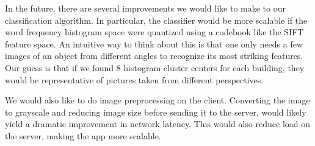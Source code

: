 In the future, there are several improvements we would like to make to our classification algorithm. 
In particular, the classifier would be more scalable if the word frequency histogram space were quantized using a codebook like the SIFT feature space. 
An intuitive way to think about this is that one only needs a few images of an object from different angles to recognize its most striking features.
Our guess is that if we found 8 histogram cluster centers for each building, they would be representative of pictures taken from different perspectives.

We would also like to do image preprocessing on the client.
Converting the image to grayscale and reducing image size before sending it
to the server, would likely yield a dramatic improvement in network latency.
This would also reduce load on the server, making the app more scalable.
